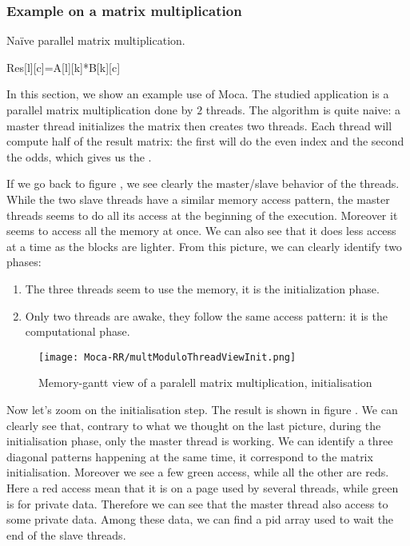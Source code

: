 \subsubsection{Example on a matrix multiplication}

\begin{algorithm}
    \caption{Naïve parallel matrix multiplication.}
    \label{alg:mat-par}
    \begin{algorithmic}
                \State Res[l][c]=A[l][k]*B[k][c]
                \EndFor
            \EndFor
        \EndFor
    \end{algorithmic}
\end{algorithm}

In this section, we show an example use of \gls{Moca}.
The studied application is a parallel matrix multiplication done by $2$ threads.
The algorithm is quite naive: a master thread initializes the matrix then creates two threads.
Each thread will compute half of the result matrix: the first will do the even index and the second the odds, which gives us the .


If we go back to figure , we see clearly the master/slave behavior of the threads.
While the two slave threads have a similar memory access pattern, the master threads seems to do all its access at the beginning of the execution.
Moreover it seems to access all the memory at once.
We can also see that it does less access at a time as the blocks are lighter.
From this picture, we can clearly identify two phases:
\begin{enumerate}
    \item The three threads seem to use the memory, it is the initialization phase.
    \item Only two threads are awake, they follow the same access pattern: it
        is the computational phase.
\end{enumerate}

\begin{figure}[htb]
    \centering
    \texttt{[image: Moca-RR/multModuloThreadViewInit.png]}
    \caption{Memory-gantt view of a paralell matrix multiplication,
    initialisation}
    \label{fig:ocelotl-th1}
\end{figure}

Now let's zoom on the initialisation step.
The result is shown in figure .
We can clearly see that, contrary to what we thought on the last picture, during the initialisation phase, only the master thread is working.
We can identify a three diagonal patterns happening at the same time, it correspond to the matrix initialisation.
Moreover we see a few green access, while all the other are reds.
Here a red access mean that it is on a page used by several threads, while green is for private data.
Therefore we can see that the master thread also access to some private data.
Among these data, we can find a pid array used to wait the end of the slave threads.

